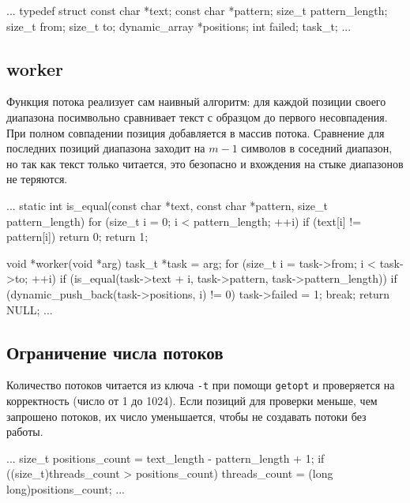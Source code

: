 \documentclass[a4paper,12pt]{article}
\begin{document}
\begin{codeblock}
...
typedef struct {
    const char *text;
    const char *pattern;
    size_t pattern_length;
    size_t from;
    size_t to;
    dynamic_array *positions;
    int failed;
} task_t;
...
\end{codeblock}


\subsection{worker}

Функция потока реализует сам наивный алгоритм: для каждой позиции своего диапазона посимвольно сравнивает текст с образцом до первого несовпадения. При полном совпадении позиция добавляется в массив потока. Сравнение для последних позиций диапазона заходит на $m-1$ символов в соседний диапазон, но так как текст только читается, это безопасно и вхождения на стыке диапазонов не теряются.

\begin{codeblock}
...
static int is_equal(const char *text, const char *pattern, size_t pattern_length) {
    for (size_t i = 0; i < pattern_length; ++i) {
        if (text[i] != pattern[i]) return 0;
    }
    return 1;
}

void *worker(void *arg) {
    task_t *task = arg;
    for (size_t i = task->from; i < task->to; ++i) {
        if (is_equal(task->text + i, task->pattern, task->pattern_length)) {
            if (dynamic_push_back(task->positions, i) != 0) {
                task->failed = 1;
                break;
            }
        }
    }
    return NULL;
}
...
\end{codeblock}


\subsection{Ограничение числа потоков}

Количество потоков читается из ключа \texttt{-t} при помощи \texttt{getopt} и проверяется на корректность (число от 1 до 1024). Если позиций для проверки меньше, чем запрошено потоков, их число уменьшается, чтобы не создавать потоки без работы.

\begin{codeblock}
...
size_t positions_count = text_length - pattern_length + 1;
if ((size_t)threads_count > positions_count) threads_count = (long long)positions_count;
...
\end{codeblock}
\end{document}
